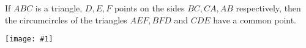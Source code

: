 \documentclass[12pt]{article}
\newcommand{\figura}[1]{\begin{center}\texttt{[image: \#1]}\end{center}}
\begin{document}
If $ABC$ is a triangle, $D,E,F$ points on the sides $BC, CA, AB$ respectively, then the circumcircles of the triangles $AEF, BFD$ and  $CDE$ have a common point.
\figura{pivot}
\end{document}
